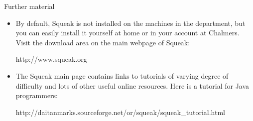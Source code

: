 \documentclass{article}
\begin{document}
Further material
\begin{itemize}
\item By default, Squeak is not installed on the machines in the department,
but you can easily install it yourself at home or in your account at
Chalmers. Visit the download area on the main webpage of Squeak:
\begin{center}
\textsf{http://www.squeak.org}
\end{center}
\item The Squeak main page contains links to tutorials of varying degree
of difficulty and lots of other useful online resources. Here is a 
tutorial for Java programmers:
\begin{center}
\textsf{http://daitanmarks.sourceforge.net/or/squeak/squeak\_tutorial.html}
\end{center}
\end{itemize}
\end{document}
